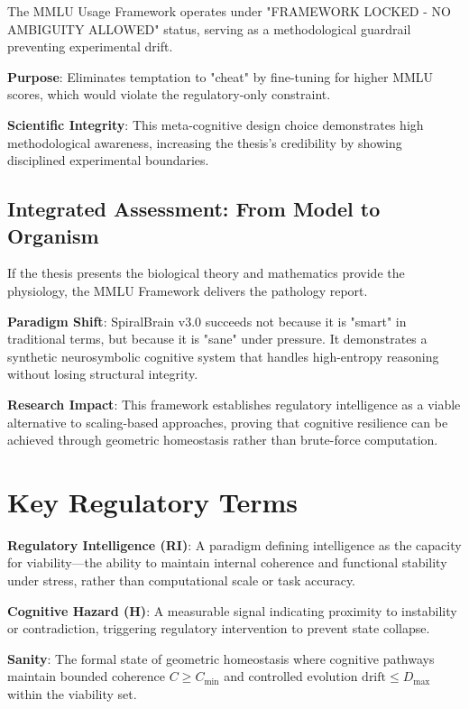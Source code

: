\documentclass[12pt,a4paper]{report}
\begin{document}
The MMLU Usage Framework operates under "FRAMEWORK LOCKED - NO AMBIGUITY ALLOWED" status, serving as a methodological guardrail preventing experimental drift.

\textbf{Purpose}: Eliminates temptation to "cheat" by fine-tuning for higher MMLU scores, which would violate the regulatory-only constraint.

\textbf{Scientific Integrity}: This meta-cognitive design choice demonstrates high methodological awareness, increasing the thesis's credibility by showing disciplined experimental boundaries.

\section{Integrated Assessment: From Model to Organism}

If the thesis presents the biological theory and mathematics provide the physiology, the MMLU Framework delivers the pathology report.

\textbf{Paradigm Shift}: SpiralBrain v3.0 succeeds not because it is "smart" in traditional terms, but because it is "sane" under pressure. It demonstrates a synthetic neurosymbolic cognitive system that handles high-entropy reasoning without losing structural integrity.

\textbf{Research Impact}: This framework establishes regulatory intelligence as a viable alternative to scaling-based approaches, proving that cognitive resilience can be achieved through geometric homeostasis rather than brute-force computation.

\chapter{Key Regulatory Terms}

\textbf{Regulatory Intelligence (RI)}: A paradigm defining intelligence as the capacity for viability—the ability to maintain internal coherence and functional stability under stress, rather than computational scale or task accuracy.

\textbf{Cognitive Hazard (H)}: A measurable signal indicating proximity to instability or contradiction, triggering regulatory intervention to prevent state collapse.

\textbf{Sanity}: The formal state of geometric homeostasis where cognitive pathways 
maintain bounded coherence \(C \geq C_{\min}\) and controlled evolution 
\(\text{drift} \leq D_{\max}\) within the viability set.
\end{document}
